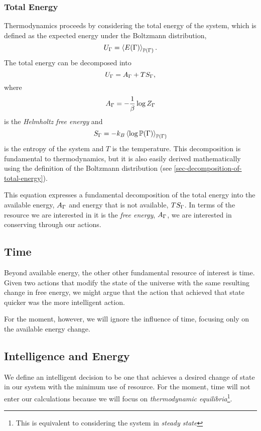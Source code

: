 \documentclass[]{article}
\begin{document}
\subsubsection{Total Energy}

Thermodynamics proceeds by considering the total energy of the system, which is defined as the expected energy under the Boltzmann distribution,
\[
U_\Gamma = \left\langle E(\Gamma) \right\rangle_{\mathbb{P}(\Gamma)}.
\] 
The total energy can be decomposed into
\[
U_\Gamma = A_\Gamma + TS_\Gamma,
\] 
where 
\[
A_\Gamma = - \frac{1}{\beta}\log Z_\Gamma
\] 
is the \emph{Helmholtz free energy} and 
\[ S_\Gamma = -k_B
\left\langle \log \mathbb{P}(\Gamma) \right\rangle_{\mathbb{P}(\Gamma)}
\] 
is the entropy of the system and \(T\) is the temperature. This decomposition is fundamental to thermodynamics, but it is also easily derived mathematically using the definition of the Boltzmann distribution (see \ref{sec-decomposition-of-total-energy}).

This equation expresses a fundamental decomposition of the total
energy into the available energy, \(A_\Gamma\) and energy
that is not available, \(TS_\Gamma\). In terms of the resource we are interested in it is the \emph{free energy}, $A_\Gamma$, we are interested in conserving through our actions.

\subsection{Time}

Beyond available energy, the other other fundamental resource of interest is time. Given two actions that modify the state of the universe with the same resulting change in free energy, we might argue that the action that achieved that state quicker was the more intelligent action. 

For the moment, however, we will ignore the influence of time, focusing only on the available energy change. 

\subsection{Intelligence and Energy} \label{sec-intelligence-and-energy}

We define an intelligent decision to be one that achieves a desired
change of state in our system with the minimum use of resource. For the
moment, time will not enter our calculations because we will focus on
\emph{thermodynamic equilibria}\footnote{This is equivalent to considering the system in \emph{steady state}}.
\end{document}
